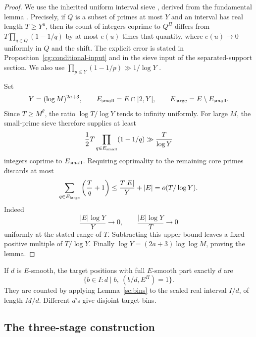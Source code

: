 \begin{proof}
We use the inherited uniform interval sieve \cite{Synthesis},
derived from the fundamental lemma \cite{Lagarias,GranvilleSound}.
Precisely, if \(Q\) is a subset of primes at most \(Y\) and an
interval has real length \(T\ge Y^u\), then its count of integers
coprime to \(Q^\Pi\) differs from
\(T\prod_{q\in Q}(1-1/q)\) by at most \(e(u)\) times that
quantity, where \(e(u)\to0\) uniformly in \(Q\) and the shift.
The explicit error is stated in Proposition~\ref{cg:conditional-input}
and in the sieve input of the separated-support section.
We also use
\(\prod_{p\le Y}(1-1/p)\gg1/\log Y\)
\cite{GranvilleSound,TaoMertens}.

Set
\[
 Y=(\log M)^{2a+3},\qquad
 E_{\rm small}=E\cap[2,Y],\qquad E_{\rm large}=E\setminus E_{\rm small}.
\]
Since \(T\ge M^\theta\), the ratio \(\log T/\log Y\) tends to
infinity uniformly. For large \(M\), the small-prime sieve therefore
supplies at least
\[
 \frac12 T\prod_{q\in E_{\rm small}}(1-1/q)
 \gg\frac T{\log Y}
\]
integers coprime to \(E_{\rm small}\).
Requiring coprimality to the remaining core primes discards at most
\[
 \sum_{q\in E_{\rm large}}\left(\frac Tq+1\right)
 \le\frac{T|E|}{Y}+|E|
 =o(T/\log Y).
\]
Indeed
\[
 \frac{|E|\log Y}{Y}\to0,\qquad
 \frac{|E|\log Y}{T}\to0
\]
uniformly at the stated range of \(T\). Subtracting this upper
bound leaves a fixed positive multiple of \(T/\log Y\).
Finally \(\log Y=(2a+3)\log\log M\), proving the lemma.
\end{proof}

If \(d\) is \(E\)-smooth, the target positions with full
\(E\)-smooth part exactly \(d\) are
\[
 \{b\in I:d\mid b,\ (b/d,E^\Pi)=1\}.
\]
They are counted by applying Lemma~\ref{sc:bins} to the scaled
real interval \(I/d\), of length \(M/d\). Different \(d\)'s
give disjoint target bins.

\subsection{The three-stage construction}

